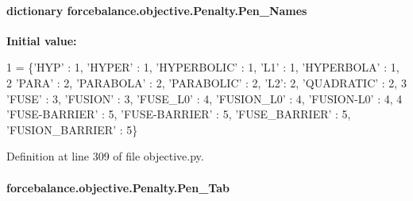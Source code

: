 \hypertarget{classforcebalance_1_1objective_1_1Penalty_a0565dc1b08520f13edc984c14aa7ceb8}{
\paragraph[{Pen\-\_\-\-Names}]{\setlength{\rightskip}{0pt plus 5cm}dictionary forcebalance.\-objective.\-Penalty.\-Pen\-\_\-\-Names\hspace{0.3cm}{\ttfamily [static]}}}\label{classforcebalance_1_1objective_1_1Penalty_a0565dc1b08520f13edc984c14aa7ceb8}
{\bfseries Initial value\-:}
\begin{DoxyCode}
1 = \{\textcolor{stringliteral}{'HYP'} : 1, \textcolor{stringliteral}{'HYPER'} : 1, \textcolor{stringliteral}{'HYPERBOLIC'} : 1, \textcolor{stringliteral}{'L1'} : 1, \textcolor{stringliteral}{'HYPERBOLA'} : 1,
2                       \textcolor{stringliteral}{'PARA'} : 2, \textcolor{stringliteral}{'PARABOLA'} : 2, \textcolor{stringliteral}{'PARABOLIC'} : 2, \textcolor{stringliteral}{'L2'}: 2, \textcolor{stringliteral}{'QUADRATIC'} : 2,
3                       \textcolor{stringliteral}{'FUSE'} : 3, \textcolor{stringliteral}{'FUSION'} : 3, \textcolor{stringliteral}{'FUSE\_L0'} : 4, \textcolor{stringliteral}{'FUSION\_L0'} : 4, \textcolor{stringliteral}{'FUSION-L0'} : 4,
4                       \textcolor{stringliteral}{'FUSE-BARRIER'} : 5, \textcolor{stringliteral}{'FUSE-BARRIER'} : 5, \textcolor{stringliteral}{'FUSE\_BARRIER'} : 5, \textcolor{stringliteral}{'FUSION\_BARRIER'} : 5\}
\end{DoxyCode}


Definition at line 309 of file objective.\-py.

\hypertarget{classforcebalance_1_1objective_1_1Penalty_a22bcc263d510e34d694faa9a70372a03}{
\paragraph[{Pen\-\_\-\-Tab}]{\setlength{\rightskip}{0pt plus 5cm}forcebalance.\-objective.\-Penalty.\-Pen\-\_\-\-Tab}}\label{classforcebalance_1_1objective_1_1Penalty_a22bcc263d510e34d694faa9a70372a03}


